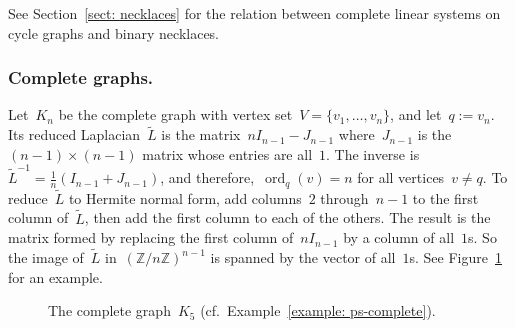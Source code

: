 \documentclass{amsart}
\DeclareMathOperator{\Jac}{Jac}
\DeclareMathOperator{\ord}{ord}
\newcommand{\Z}{\mathbb{Z}}
\newcommand{\tL}{\tilde{L}}
\begin{document}
See Section~\ref{sect: necklaces} for the relation between complete linear
systems on cycle graphs and binary necklaces.

\subsubsection{Complete graphs.}\label{example: ps-complete} Let~$K_n$ be the
complete graph with vertex set~$V=\{v_1,\dots,v_n\}$, and let~$q:=v_n$. Its reduced
Laplacian~$\tL$ is the matrix~$nI_{n-1}-J_{n-1}$ where~$J_{n-1}$ is
the~$(n-1)\times(n-1)$ matrix whose entries are all~$1$. The inverse
is~$\tL^{-1}=\frac{1}{n}(I_{n-1}+J_{n-1})$, and therefore,~$\ord_{q}(v)=n$ for all
vertices~$v\neq q$. To reduce~$\tL$ to Hermite normal form, add
columns~$2$ through~$n-1$ to the first column of~$\tL$,
then add the first column to each of the others.  The result is the matrix
formed by replacing the first column of~$nI_{n-1}$ by a column of all~$1$s. So
the image of~$\tL$ in~$(\Z/n\Z)^{n-1}$ is spanned by the vector of all~$1$s.
See Figure~\ref{fig: ps-complete} for an example.  
\begin{figure}[ht]
\centering
{}
\caption{The complete graph~$K_5$ (cf.~Example~\ref{example:
ps-complete}).}\label{fig: ps-complete}
\end{figure}
\end{document}
